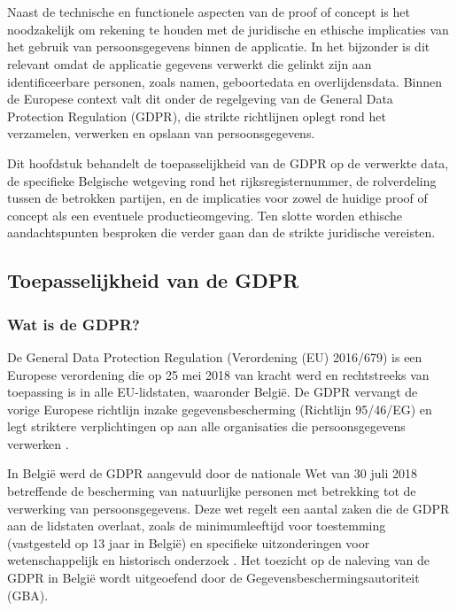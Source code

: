\chapter{}%
\label{ch:juridische-analyse}

Naast de technische en functionele aspecten van de proof of concept is het noodzakelijk om rekening te houden met de juridische en ethische implicaties van het gebruik van persoonsgegevens binnen de applicatie. In het bijzonder is dit relevant omdat de applicatie gegevens verwerkt die gelinkt zijn aan identificeerbare personen, zoals namen, geboortedata en overlijdensdata. Binnen de Europese context valt dit onder de regelgeving van de General Data Protection Regulation (GDPR), die strikte richtlijnen oplegt rond het verzamelen, verwerken en opslaan van persoonsgegevens.

Dit hoofdstuk behandelt de toepasselijkheid van de GDPR op de verwerkte data, de specifieke Belgische wetgeving rond het rijksregisternummer, de rolverdeling tussen de betrokken partijen, en de implicaties voor zowel de huidige proof of concept als een eventuele productieomgeving. Ten slotte worden ethische aandachtspunten besproken die verder gaan dan de strikte juridische vereisten.

\section{Toepasselijkheid van de GDPR}

\subsection{Wat is de GDPR?}

De General Data Protection Regulation (Verordening (EU) 2016/679) is een Europese verordening die op 25 mei 2018 van kracht werd en rechtstreeks van toepassing is in alle EU-lidstaten, waaronder België. De GDPR vervangt de vorige Europese richtlijn inzake gegevensbescherming (Richtlijn 95/46/EG) en legt striktere verplichtingen op aan alle organisaties die persoonsgegevens verwerken \autocite{EuroparlGDPR2016}.

In België werd de GDPR aangevuld door de nationale Wet van 30 juli 2018 betreffende de bescherming van natuurlijke personen met betrekking tot de verwerking van persoonsgegevens. Deze wet regelt een aantal zaken die de GDPR aan de lidstaten overlaat, zoals de minimumleeftijd voor toestemming (vastgesteld op 13 jaar in België) en specifieke uitzonderingen voor wetenschappelijk en historisch onderzoek \autocite{BelgischeWet2018}. Het toezicht op de naleving van de GDPR in België wordt uitgeoefend door de Gegevensbeschermingsautoriteit (GBA).

